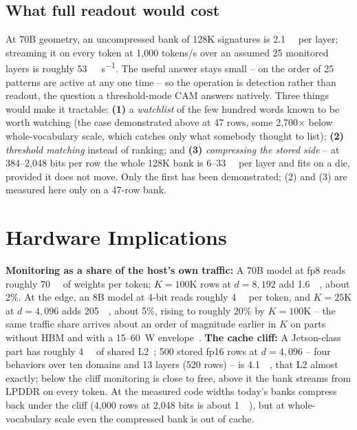 \documentclass[conference]{IEEEtran}
\newcommand{\cam}{{CAM}\xspace}
\begin{document}
\subsection{What full readout would cost}
\label{subsec:ReadoutCost}
At 70B geometry, an uncompressed bank of 128K signatures is
\qty{2.1}{\giga\byte} per layer; streaming it on every token at
1{,}000 tokens/s over an assumed 25 monitored layers is roughly
\qty{53}{\tera\byte\per\second}. The useful answer stays small
-- on the order of 25 patterns are active at any one time -- so the
operation is detection rather than readout, the question a
threshold-mode \cam answers natively. Three things would make it
tractable: {\bf (1)} a \emph{watchlist} of the
few hundred words known to be worth watching (the case demonstrated
above at 47 rows, some 2{,}700$\times$ below whole-vocabulary scale,
which catches only what somebody thought to list); {\bf (2)}
\emph{threshold matching} instead of ranking; and {\bf (3)}
\emph{compressing the stored side} -- at 384--2{,}048 bits per row
the whole 128K bank is 6--\qty{33}{\mega\byte} per layer and fits on a
die, provided it does
not move. Only the first has been demonstrated; (2) and (3) are
measured here only on a 47-row bank.

\section{Hardware Implications}
\label{sec:Hardware}
\label{subsec:Tax}
\label{subsec:CacheCliff}
\textbf{Monitoring as a share of the host's own traffic:} A 70B
model at fp8 reads roughly \qty{70}{\giga\byte} of weights per
token; $K=100$K rows at $d=8{,}192$ add \qty{1.6}{\giga\byte}, about
2\%. At the edge, an 8B model at 4-bit reads roughly
\qty{4}{\giga\byte} per token, and $K=25$K at $d=4{,}096$ adds
\qty{205}{\mega\byte}, about 5\%, rising to roughly 20\% by
$K=100$K -- the same traffic share arrives about an order of
magnitude earlier in $K$ on parts without HBM and with a
15--\qty{60}{\watt} envelope~\cite{nvidia_orin}.
\textbf{The cache cliff:} A Jetson-class part has roughly
\qty{4}{\mega\byte} of shared L2~\cite{nvidia_orin}; 500 stored fp16
rows at $d=4{,}096$ -- four behaviors over ten domains and 13 layers
(520 rows) -- is \qty{4.1}{\mega\byte}, that L2 almost exactly; below the cliff
monitoring is close to free, above it the bank streams from LPDDR on
every token. At the measured code widths today's banks compress back
under the cliff (4{,}000 rows at 2{,}048 bits is about
\qty{1}{\mega\byte}), but at whole-vocabulary scale even the
compressed bank is out of cache.
\end{document}
